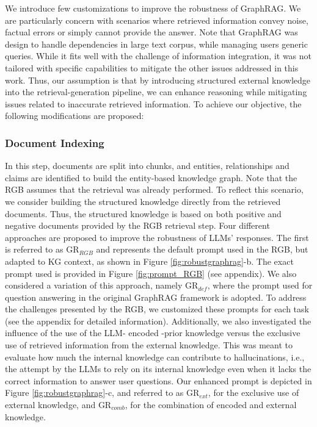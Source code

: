\documentclass[letterpaper, 10 pt, conference]{ieeeconf}  %
\begin{document}
We introduce few customizations to improve the robustness of GraphRAG. We are particularly concern with scenarios where retrieved information convey noise, factual errors or simply cannot provide the answer. Note that GraphRAG was design to handle dependencies in large text corpus, while managing users generic queries. While it fits well with the challenge of information integration, it was not tailored with specific capabilities to mitigate the other issues addressed in this work. Thus, our assumption is that by introducing structured external knowledge into the retrieval-generation pipeline, we can enhance reasoning while mitigating issues related to inaccurate retrieved information. To achieve our objective, the following modifications are proposed:



\subsubsection{Document Indexing} In this step, documents are split into chunks, and entities, relationships and claims are identified to build the entity-based knowledge graph. Note that the RGB assumes that the retrieval was already performed. To reflect this scenario, we consider building the structured knowledge directly from the retrieved documents. Thus, the structured knowledge is based on both positive and negative documents provided by the RGB retrieval step. Four different approaches are proposed to improve the robustness of LLMs' responses. The first is referred to as GR$_{RGB}$ and represents the default prompt used in the RGB, but adapted to KG context, as shown in Figure \ref{fig:robustgraphrag}-b. The exact prompt used is provided in Figure \ref{fig:prompt_RGB} (see appendix). We also considered a variation of this approach, namely GR$_{def}$, where the prompt used for question answering in the original GraphRAG framework is adopted. To address the challenges presented by the RGB, we customized these prompts for each task (see the appendix for detailed information). Additionally, we also investigated the influence of the use of the LLM- encoded -prior knowledge versus the exclusive use of retrieved information from the external knowledge. This was meant to evaluate how much the internal knowledge can contribute to hallucinations, i.e., the attempt by the LLMs to rely on its internal knowledge even when it lacks the correct information to answer user questions. Our enhanced prompt is depicted in Figure \ref{fig:robustgraphrag}-c, and referred to as GR$_{ext}$, for the exclusive use of external knowledge, and GR$_{comb}$, for the combination of encoded and external knowledge.
\end{document}
